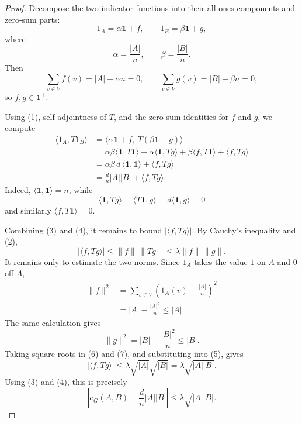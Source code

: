 \begin{proof}
Decompose the two indicator functions into their all-ones components and zero-sum parts:
\[
  1_A=\alpha\mathbf 1+f,\qquad
  1_B=\beta\mathbf 1+g,
\]
where
\[
  \alpha=\frac{|A|}{n},\qquad \beta=\frac{|B|}{n}.
\]
Then
\[
  \sum_{v\in V} f(v)=|A|-\alpha n=0,
  \qquad
  \sum_{v\in V} g(v)=|B|-\beta n=0,
\]
so \(f,g\in\mathbf 1^\perp\).

Using (1), self-adjointness of \(T\), and the zero-sum identities for \(f\) and \(g\), we compute
\[
\begin{aligned}
  \langle 1_A,T1_B\rangle
  &=\langle \alpha\mathbf 1+f,\ T(\beta\mathbf 1+g)\rangle\\
  &=\alpha\beta\langle \mathbf 1,T\mathbf 1\rangle
    +\alpha\langle \mathbf 1,Tg\rangle
    +\beta\langle f,T\mathbf 1\rangle
    +\langle f,Tg\rangle\\
  &=\alpha\beta\,d\,\langle\mathbf 1,\mathbf 1\rangle+\langle f,Tg\rangle\\
  &=\frac d n |A||B|+\langle f,Tg\rangle.
\end{aligned} \tag{4}
\]
Indeed, \(\langle\mathbf 1,\mathbf 1\rangle=n\), while
\[
  \langle \mathbf 1,Tg\rangle=\langle T\mathbf 1,g\rangle
  =d\langle\mathbf 1,g\rangle=0
\]
and similarly \(\langle f,T\mathbf 1\rangle=0\).

Combining (3) and (4), it remains to bound \(|\langle f,Tg\rangle|\). By Cauchy's inequality and (2),
\[
  |\langle f,Tg\rangle|
  \le \|f\|\,\|Tg\|
  \le \lambda\|f\|\,\|g\|. \tag{5}
\]
It remains only to estimate the two norms. Since \(1_A\) takes the value \(1\) on \(A\) and \(0\) off \(A\),
\[
\begin{aligned}
  \|f\|^2
  &=\sum_{v\in V}\left(1_A(v)-\frac{|A|}{n}\right)^2\\
  &=|A|-\frac{|A|^2}{n}
  \le |A|.
\end{aligned} \tag{6}
\]
The same calculation gives
\[
  \|g\|^2=|B|-\frac{|B|^2}{n}\le |B|. \tag{7}
\]
Taking square roots in (6) and (7), and substituting into (5), gives
\[
  |\langle f,Tg\rangle|
  \le \lambda\sqrt{|A|}\sqrt{|B|}
  =\lambda\sqrt{|A||B|}.
\]
Using (3) and (4), this is precisely
\[
  \left|e_G(A,B)-\frac d n |A||B|\right|
    \le \lambda\sqrt{|A||B|}.
\]
\end{proof}
